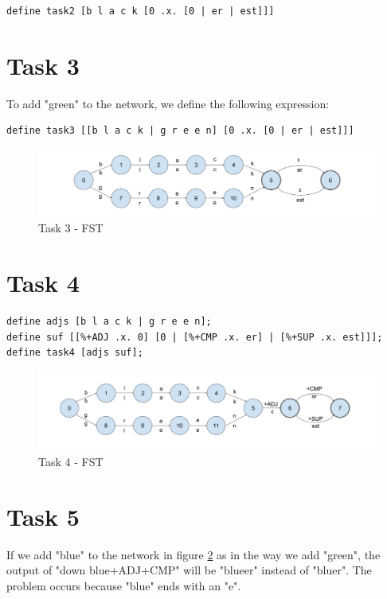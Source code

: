 \documentclass[]{article}
\begin{document}
\begin{lstlisting}
define task2 [b l a c k [0 .x. [0 | er | est]]]
\end{lstlisting}

\section{Task 3}
To add "green" to the network, we define the following expression:

\begin{lstlisting}
define task3 [[b l a c k | g r e e n] [0 .x. [0 | er | est]]]
\end{lstlisting}


\begin{figure}[H]
	\centering
	\includegraphics[scale=0.27]{xfst-task3}
	\caption{Task 3 - FST}
	\label{fig:xfst-task3}
\end{figure}

\section{Task 4}

\begin{lstlisting}
define adjs [b l a c k | g r e e n];
define suf [[%+ADJ .x. 0] [0 | [%+CMP .x. er] | [%+SUP .x. est]]];
define task4 [adjs suf];
\end{lstlisting}


\begin{figure}[H]
	\centering
	\includegraphics[scale=0.27]{xfst-task4}
	\caption{Task 4 - FST}
	\label{fig:xfst-task4}
\end{figure}


\section{Task 5}
If we add "blue" to the network in figure \ref{fig:xfst-task4} as in the way we add "green", the output of "down blue+ADJ+CMP" will be "blueer" instead of "bluer". The problem occurs because "blue" ends with an "e".
\end{document}

